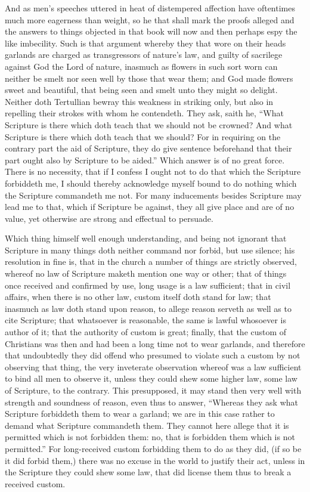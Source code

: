 And as men’s speeches uttered in heat of distempered affection have oftentimes much more eagerness than weight, so he that shall mark the proofs alleged and the answers to things objected in that book will now and then perhaps espy the like imbecility. Such is that argument whereby they that wore on their heads garlands are charged as transgressors of nature’s law, and guilty of sacrilege against God the Lord of nature, inasmuch as flowers in such sort worn can neither be smelt nor seen well by those that wear them; and God made flowers sweet and beautiful, that being seen and smelt  unto they might so delight. Neither doth Tertullian bewray this weakness in striking only, but also in repelling their strokes with whom he contendeth. They ask, saith he, “What Scripture is there which doth teach that we should not be crowned? And what Scripture is there which doth teach that we should? For in requiring on the contrary part the aid of Scripture, they do give sentence beforehand that their part ought also by Scripture to be aided.” Which answer is of no great force. There is no necessity, that if I confess I ought not to do that which the Scripture forbiddeth me, I should thereby acknowledge myself bound to do nothing which the Scripture commandeth me not. For many inducements besides Scripture may lead me to that, which if Scripture be against, they all give place and are of no value, yet otherwise are strong and effectual to persuade.

Which thing himself well enough understanding, and being not ignorant that Scripture in many things doth neither command nor forbid, but use silence; his resolution in fine is, that in the church a number of things are strictly observed, whereof no law of Scripture maketh mention one way or other; that of things once received and confirmed by use, long usage is a law sufficient; that in civil affairs, when there is no other law, custom itself doth stand for law; that inasmuch as law doth stand upon reason, to allege reason serveth as well as to cite Scripture; that whatsoever is reasonable, the same is lawful whosoever is author of it; that the authority  of custom is great; finally, that the custom of Christians was then and had been a long time not to wear garlands, and therefore that undoubtedly they did offend who presumed to violate such a custom by not observing that thing, the very inveterate observation whereof was a law sufficient to bind all men to observe it, unless they could shew some higher law, some law of Scripture, to the contrary. This presupposed, it may stand then very well with strength and soundness of reason, even thus to answer, “Whereas they ask what Scripture forbiddeth them to wear a garland; we are in this case rather to demand what Scripture commandeth them. They cannot here allege that it is permitted which is not forbidden them: no, that is forbidden them which is not permitted.” For long-received custom forbidding them to do as they did, (if so be it did forbid them,) there was no excuse in the world to justify their act, unless in the Scripture they could shew some law, that did license them thus to break a received custom.


